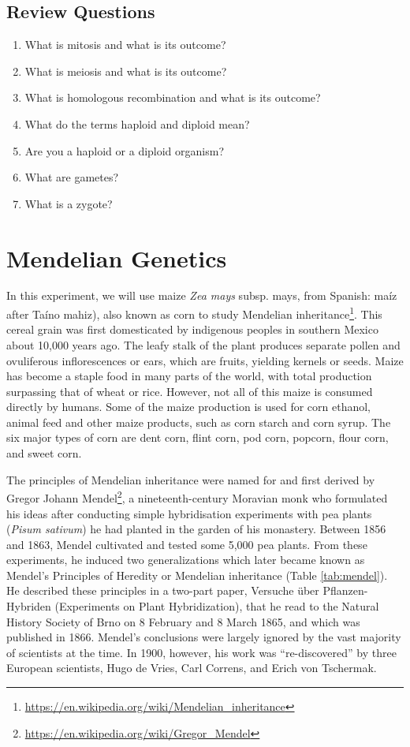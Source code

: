\documentclass[]{book}
\providecommand{\tightlist}{%
  \setlength{\itemsep}{0pt}\setlength{\parskip}{0pt}}
\let\rmarkdownfootnote\footnote%
\def\footnote{\protect\rmarkdownfootnote}
\renewcommand{\href}[2]{#2\footnote{\url{#1}}}
\begin{document}
\hypertarget{review-questions-6}{%
\section{Review Questions}\label{review-questions-6}}

\begin{enumerate}
\def\labelenumi{\arabic{enumi}.}
\tightlist
\item
  What is mitosis and what is its outcome?
\item
  What is meiosis and what is its outcome?
\item
  What is homologous recombination and what is its outcome?
\item
  What do the terms haploid and diploid mean?
\item
  Are you a haploid or a diploid organism?
\item
  What are gametes?
\item
  What is a zygote?
\end{enumerate}

\hypertarget{mendelian-genetics}{%
\chapter{Mendelian Genetics}\label{mendelian-genetics}}

In this experiment, we will use maize \emph{Zea mays} subsp. mays, from Spanish: maíz after Taíno mahiz), also known as corn to study \href{https://en.wikipedia.org/wiki/Mendelian_inheritance}{Mendelian inheritance}. This cereal grain was first domesticated by indigenous peoples in southern Mexico about 10,000 years ago. The leafy stalk of the plant produces separate pollen and ovuliferous inflorescences or ears, which are fruits, yielding kernels or seeds. Maize has become a staple food in many parts of the world, with total production surpassing that of wheat or rice. However, not all of this maize is consumed directly by humans. Some of the maize production is used for corn ethanol, animal feed and other maize products, such as corn starch and corn syrup. The six major types of corn are dent corn, flint corn, pod corn, popcorn, flour corn, and sweet corn.

The principles of Mendelian inheritance were named for and first derived by \href{https://en.wikipedia.org/wiki/Gregor_Mendel}{Gregor Johann Mendel}, a nineteenth-century Moravian monk who formulated his ideas after conducting simple hybridisation experiments with pea plants (\emph{Pisum sativum}) he had planted in the garden of his monastery. Between 1856 and 1863, Mendel cultivated and tested some 5,000 pea plants. From these experiments, he induced two generalizations which later became known as Mendel's Principles of Heredity or Mendelian inheritance (Table \ref{tab:mendel}). He described these principles in a two-part paper, Versuche über Pflanzen-Hybriden (Experiments on Plant Hybridization), that he read to the Natural History Society of Brno on 8 February and 8 March 1865, and which was published in 1866. Mendel's conclusions were largely ignored by the vast majority of scientists at the time. In 1900, however, his work was ``re-discovered'' by three European scientists, Hugo de Vries, Carl Correns, and Erich von Tschermak.
\end{document}
